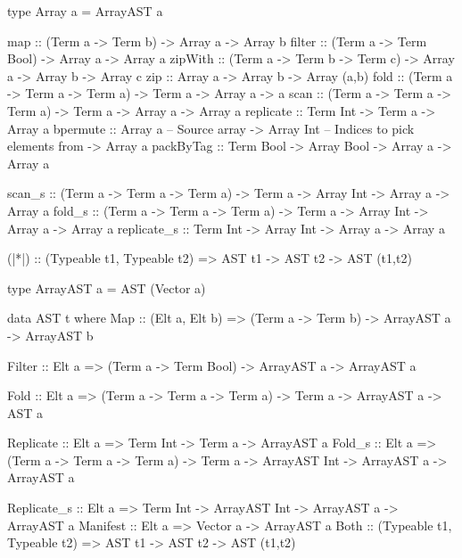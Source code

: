 \documentclass[preamble.tex]{subfiles}
\begin{document}
\begin{hscode2}[%
    caption={\LiveFusion interface functions. Typeclass constraints on array elements have been omitted for brevity.},%
    label=lst:LiveFusion-interface,%
]
type Array a = ArrayAST a

map      :: (Term a -> Term b) -> Array a -> Array b
filter   :: (Term a -> Term Bool) -> Array a -> Array a
zipWith  :: (Term a -> Term b -> Term c) -> Array a -> Array b -> Array c
zip      :: Array a -> Array b -> Array (a,b)
fold     :: (Term a -> Term a -> Term a) -> Term a -> Array a -> a
scan     :: (Term a -> Term a -> Term a) -> Term a -> Array a -> Array a
replicate :: Term Int -> Term a -> Array a
bpermute :: Array a      -- Source array
         -> Array Int    -- Indices to pick elements from
         -> Array a
packByTag :: Term Bool -> Array Bool -> Array a -> Array a

scan_s   :: (Term a -> Term a -> Term a) -> Term a
         -> Array Int -> Array a -> Array a
fold_s   :: (Term a -> Term a -> Term a) -> Term a
         -> Array Int -> Array a -> Array a
replicate_s :: Term Int -> Array Int -> Array a -> Array a

(|*|)    :: (Typeable t1, Typeable t2)
         => AST t1 -> AST t2 -> AST (t1,t2)
\end{hscode2}


\begin{hscode2}[%
    caption={\LiveFusion AST (partial).},%
    label=lst:LiveFusion-AST,%
]
type ArrayAST a = AST (Vector a)

data AST t where
  Map         :: (Elt a, Elt b)
              => (Term a -> Term b)
              -> ArrayAST a
              -> ArrayAST b

  Filter      :: Elt a
              => (Term a -> Term Bool)
              -> ArrayAST a
              -> ArrayAST a

  Fold        :: Elt a
              => (Term a -> Term a -> Term a)
              -> Term a
              -> ArrayAST a
              -> AST a

  Replicate   :: Elt a
              => Term Int
              -> Term a
              -> ArrayAST a
  Fold_s      :: Elt a
              => (Term a -> Term a -> Term a)
              -> Term a
              -> ArrayAST Int
              -> ArrayAST a
              -> ArrayAST a

  Replicate_s :: Elt a
              => Term Int
              -> ArrayAST Int
              -> ArrayAST a
              -> ArrayAST a
  Manifest    :: Elt a
              => Vector a
              -> ArrayAST a
  Both        :: (Typeable t1, Typeable t2)
              => AST t1
              -> AST t2
              -> AST (t1,t2)
\end{hscode2}
\end{document}
